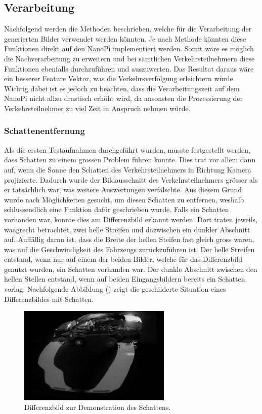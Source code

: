 \subsection{Verarbeitung}
Nachfolgend werden die Methoden beschrieben, welche für die Verarbeitung der generierten Bilder verwendet werden könnten. Je nach Methode könnten diese Funktionen direkt auf den NanoPi implementiert werden. Somit wäre es möglich die Nachverarbeitung zu erweitern und bei sämtlichen Verkehrsteilnehmern diese Funktionen ebenfalls durchzuführen und auszuwerten. Das Resultat daraus wäre ein besserer Feature Vektor, was die Verkehrsverfolgung erleichtern würde. Wichtig dabei ist es jedoch zu beachten, dass die Verarbeitungszeit auf dem NanoPi nicht allzu drastisch erhöht wird, da ansonsten die Prozessierung der Verkehrsteilnehmer zu viel Zeit in Anspruch nehmen würde.

\subsubsection{Schattenentfernung}
Als die ersten Testaufnahmen durchgeführt wurden, musste festgestellt werden, dass Schatten zu einem grossen Problem führen konnte. Dies trat vor allem dann auf, wenn die Sonne den Schatten des Verkehrsteilnehmers in Richtung Kamera projizierte. Dadurch wurde der Bildausschnitt des Verkehrsteilnehmers grösser als er tatsächlich war, was weitere Auswertungen verfälschte. Aus diesem Grund wurde nach Möglichkeiten gesucht, um diesen Schatten zu entfernen, weshalb schlussendlich eine Funktion dafür geschrieben wurde.
Falls ein Schatten vorhanden war, konnte dies am Differenzbild erkannt werden. Dort traten jeweils, waagrecht betrachtet, zwei helle Streifen und dazwischen ein dunkler Abschnitt auf. Auffällig daran ist, dass die Breite der hellen Steifen fast gleich gross waren, was auf die Geschwindigkeit des Fahrzeugs zurückzuführen ist. Der helle Streifen entstand, wenn nur auf einem der beiden Bilder, welche für das Differenzbild genutzt wurden, ein Schatten vorhanden war. Der dunkle Abschnitt zwischen den hellen Stellen entstand, wenn auf beiden Eingangsbildern bereits ein Schatten vorlag. Nachfolgende Abbildung () zeigt die geschilderte Situation eines Differenzbildes mit Schatten.

\begin{figure}[H]
  \centering
  \includegraphics[width=0.65\textwidth]{Testversuche/BlurRemoveShadow.jpg} 
  \caption{Differenzbild zur Demonstration des Schattens.}
  \label{bBlurRemoveShadow}
\end{figure} 

